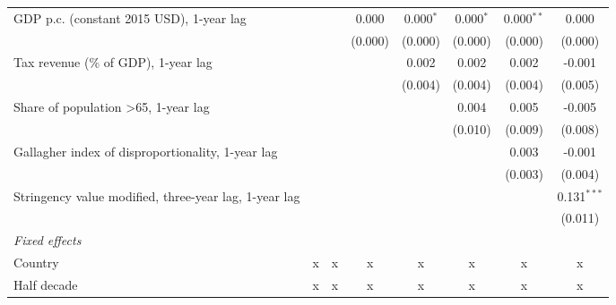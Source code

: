 \begin{table}[htbp]
\begin{tabular}{lccccccc}
      GDP p.c. (constant 2015 USD), 1-year lag                                &              &              & 0.000        & 0.000$^{*}$  & 0.000$^{*}$  & 0.000$^{**}$ & 0.000\\   
                                                                              &              &              & (0.000)      & (0.000)      & (0.000)      & (0.000)      & (0.000)\\   
      Tax revenue (\% of GDP), 1-year lag                                     &              &              &              & 0.002        & 0.002        & 0.002        & -0.001\\   
                                                                              &              &              &              & (0.004)      & (0.004)      & (0.004)      & (0.005)\\   
      Share of population >65, 1-year lag                                     &              &              &              &              & 0.004        & 0.005        & -0.005\\   
                                                                              &              &              &              &              & (0.010)      & (0.009)      & (0.008)\\   
      Gallagher index of disproportionality, 1-year lag                       &              &              &              &              &              & 0.003        & -0.001\\   
                                                                              &              &              &              &              &              & (0.003)      & (0.004)\\   
      Stringency value modified, three-year lag, 1-year lag                   &              &              &              &              &              &              & 0.131$^{***}$\\   
                                                                              &              &              &              &              &              &              & (0.011)\\   
      \emph{Fixed effects}\\
      Country                                                                 & x            & x            & x            & x            & x            & x            & x\\  
      Half decade                                                             & x            & x            & x            & x            & x            & x            & x\\  

\end{tabular}
\end{table}
